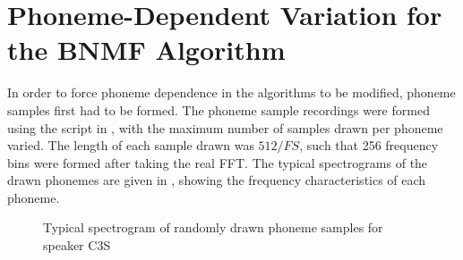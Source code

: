 \clearpage{}


\section{Phoneme-Dependent Variation for the \acl{BNMF} Algorithm}

In order to force phoneme dependence in the algorithms to be modified,
phoneme samples first had to be formed. The phoneme sample recordings
were formed using the script in , with the
maximum number of samples drawn per phoneme varied. The length of
each sample drawn was $512/FS$, such that 256 frequency bins were
formed after taking the real \ac{FFT}. The typical spectrograms of
the drawn phonemes are given in ,
showing the frequency characteristics of each phoneme.

\begin{figure}[h]




\protect\caption{\label{fig:drawn-phoneme-spectrogram}Typical spectrogram of randomly
drawn phoneme samples for speaker C3S}
\end{figure}




